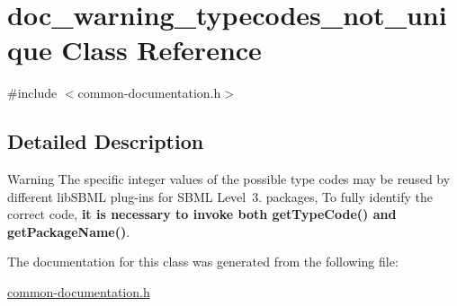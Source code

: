 \hypertarget{classdoc__warning__typecodes__not__unique}{}\section{doc\+\_\+warning\+\_\+typecodes\+\_\+not\+\_\+unique Class Reference}
\label{classdoc__warning__typecodes__not__unique}


{\ttfamily \#include $<$common-\/documentation.\+h$>$}



\subsection{Detailed Description}
\begin{DoxyWarning}{Warning}
The specific integer values of the possible type codes may be reused by different lib\+S\+B\+ML plug-\/ins for S\+B\+ML Level~3. packages, To fully identify the correct code, {\bfseries it is necessary to invoke both get\+Type\+Code() and get\+Package\+Name()}. 
\end{DoxyWarning}


The documentation for this class was generated from the following file\+:\begin{DoxyCompactItemize}
\item 
\hyperlink{common-documentation_8h}{common-\/documentation.\+h}\end{DoxyCompactItemize}
